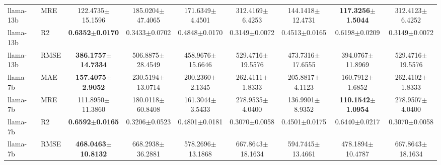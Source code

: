 \begin{table}[t]
\begin{tabular}{llccccccc}
llama-13b & MRE & 122.4735$\pm$15.1596 & 185.0204$\pm$47.4065 & 171.6349$\pm$4.4501 & 312.4169$\pm$6.4253 & 144.1418$\pm$12.4731 & \textbf{117.3256$\pm$1.5044} & 312.4123$\pm$6.4252 \\
llama-13b & R2 & \textbf{0.6352$\pm$0.0170} & 0.3433$\pm$0.0702 & 0.4848$\pm$0.0170 & 0.3149$\pm$0.0072 & 0.4513$\pm$0.0165 & 0.6198$\pm$0.0209 & 0.3149$\pm$0.0072 \\
llama-13b & RMSE & \textbf{386.1757$\pm$14.7334} & 506.8875$\pm$28.4549 & 458.9676$\pm$15.6646 & 529.4716$\pm$19.5576 & 473.7316$\pm$17.6555 & 394.0767$\pm$11.8969 & 529.4716$\pm$19.5576 \\
\addlinespace
llama-7b & MAE & \textbf{157.4075$\pm$2.9052} & 230.5194$\pm$13.0714 & 200.2360$\pm$2.1345 & 262.4111$\pm$1.8333 & 205.8817$\pm$4.1123 & 160.7912$\pm$1.6852 & 262.4102$\pm$1.8333 \\
llama-7b & MRE & 111.8950$\pm$11.3860 & 180.0118$\pm$60.8408 & 161.3044$\pm$3.5433 & 278.9535$\pm$4.0400 & 136.9901$\pm$8.9352 & \textbf{110.1542$\pm$1.0954} & 278.9507$\pm$4.0400 \\
llama-7b & R2 & \textbf{0.6592$\pm$0.0165} & 0.3206$\pm$0.0523 & 0.4801$\pm$0.0181 & 0.3070$\pm$0.0058 & 0.4501$\pm$0.0175 & 0.6440$\pm$0.0217 & 0.3070$\pm$0.0058 \\
llama-7b & RMSE & \textbf{468.0463$\pm$10.8132} & 668.2938$\pm$36.2881 & 578.2696$\pm$13.1868 & 667.8643$\pm$18.1634 & 594.7445$\pm$13.4661 & 478.1894$\pm$10.4787 & 667.8643$\pm$18.1634 \\
\bottomrule
\end{tabular}
\end{table}